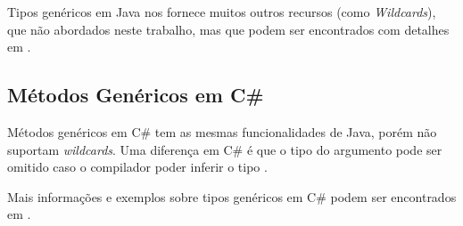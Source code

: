 Tipos genéricos em Java nos fornece muitos outros recursos (como \emph{Wildcards}), que não abordados neste trabalho, mas que podem ser encontrados com detalhes em \cite{generics_java}.

\subsection{Métodos Genéricos em C\#} %
\label{sub:metodos_genericos_em_c_sharp}
Métodos genéricos em C\# tem as mesmas funcionalidades de Java, porém não suportam \emph{wildcards}. Uma diferença em C\# é que o tipo do argumento pode ser omitido caso o compilador poder inferir o tipo \cite{sebesta}. 

Mais informações e exemplos sobre tipos genéricos em C\# podem ser encontrados em \cite{generics_msdn}.


